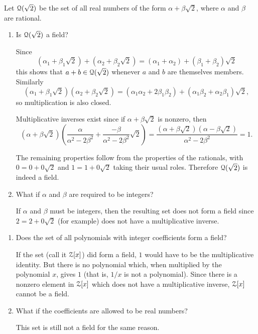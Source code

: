  Let $\mathcal{Q}(\sqrt2)$ be the set of all real numbers of the form
$\alpha + \beta\sqrt2$, where $\alpha$ and $\beta$ are rational.
\begin{enumerate}
\item Is $\mathcal{Q}(\sqrt2)$ a field?
  \begin{solution}
    Since
    \begin{equation*}
      (\alpha_1 + \beta_1\sqrt2) + (\alpha_2 + \beta_2\sqrt2)
      = (\alpha_1 + \alpha_2) + (\beta_1 + \beta_2)\sqrt2
    \end{equation*}
    this shows that $a + b\in\mathcal{Q}(\sqrt2)$ whenever $a$ and $b$ are
    themselves members. Similarly
    \begin{equation*}
      (\alpha_1 + \beta_1\sqrt2)(\alpha_2 + \beta_2\sqrt2)
      = (\alpha_1\alpha_2 + 2\beta_1\beta_2)
      + (\alpha_1\beta_2 + \alpha_2\beta_1)\sqrt2,
    \end{equation*}
    so multiplication is also closed.

    Multiplicative inverses exist since if $\alpha + \beta\sqrt2$ is
    nonzero, then
    \begin{equation*}
      (\alpha + \beta\sqrt2)
      \left(\frac{\alpha}{\alpha^2 - 2\beta^2}
        + \frac{-\beta}{\alpha^2 - 2\beta^2}\sqrt2\right)
      = \frac{(\alpha+\beta\sqrt2)(\alpha-\beta\sqrt2)}
      {\alpha^2 - 2\beta^2} = 1.
    \end{equation*}

    The remaining properties follow from the properties of the
    rationals, with $0 = 0 + 0\sqrt2$ and $1 = 1 + 0\sqrt2$ taking
    their usual roles. Therefore $\mathcal{Q}(\sqrt2)$ is indeed a field.
  \end{solution}
\item What if $\alpha$ and $\beta$ are required to be integers?
  \begin{solution}
    If $\alpha$ and $\beta$ must be integers, then the resulting set
    does not form a field since $2 = 2 + 0\sqrt2$ (for example) does
    not have a multiplicative inverse.
  \end{solution}
\end{enumerate}

\begin{enumerate}
\item Does the set of all polynomials with integer coefficients form a
  field?
  \begin{solution}
    If the set (call it $\mathcal{Z}[x]$) did form a field, $1$ would have to
    be the multiplicative identity. But there is no polynomial which,
    when multiplied by the polynomial $x$, gives $1$ (that is, $1/x$
    is not a polynomial). Since there is a nonzero element in $\mathcal{Z}[x]$
    which does not have a multiplicative inverse, $\mathcal{Z}[x]$ cannot be a
    field.
  \end{solution}
\item What if the coefficients are allowed to be real numbers?
  \begin{solution}
    This set is still not a field for the same reason.
  \end{solution}
\end{enumerate}

